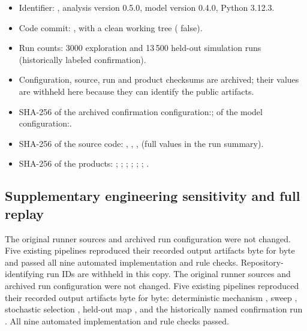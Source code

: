 \begin{itemize}
  \raggedright
  \item Identifier: \code{\RunID}, analysis version 0.5.0, model version 0.4.0, Python 3.12.3.
  \item Code commit: \ifdefined\blindreviewmode{}\else{}\fi, with a clean working tree ( false).
  \item Run counts: 3000 exploration and 13\,500 held-out simulation runs (historically labeled confirmation).
  \ifdefined\blindreviewmode
  \item Configuration, source, run and product checksums are archived; their values are withheld here because they can identify the public artifacts.
  \else
  \item SHA-256 of the archived confirmation configuration:\newline{}; of the model configuration:\newline{}.
  \item SHA-256 of the source code:  ,  ,  ,   (full values in the run summary).
  \item SHA-256 of the products:  ;  ;  ;  ;\newline{} ;\newline{} ;  .
  \fi
\end{itemize}

\subsection*{Supplementary engineering sensitivity and full replay}

\ifdefined\blindreviewmode
The original runner sources and archived run configuration were not changed. Five existing pipelines reproduced their recorded output artifacts byte for byte and passed all nine automated implementation and rule checks. Repository-identifying run IDs are withheld in this copy.
\else
The original runner sources and archived run configuration were not changed. Five existing pipelines reproduced their recorded output artifacts byte for byte: deterministic mechanism , sweep , stochastic selection , held-out map , and the historically named confirmation run . All nine automated implementation and rule checks passed.
\fi

